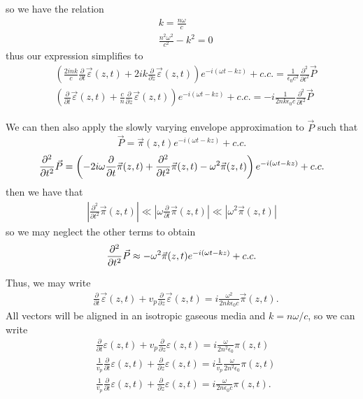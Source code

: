 \documentclass[aps,pra,showpacs,amsmath,amssymb,nofootinbib,longbibliography,superscriptaddress
]{revtex4-1}
\theoremstyle{definition}
\theoremstyle{remark}
\newcommand{\0}{\hat{0}}
\begin{document}
so we have the relation
\begin{align}
    &k = \frac{n \omega}{c}\\
    &\frac{n^2 \omega^2}{c^2} - k^2 = 0
\end{align}
thus our expression simplifies to
\begin{align}
    &\left(\frac{2 i n k}{c} \frac{\partial}{\partial t} \vec{\varepsilon}(z, t) + 2 i k \frac{\partial}{\partial z} \vec{\varepsilon}(z, t) \right)e^{-i (\omega t - kz)} + c.c. = \frac{1}{\epsilon_0 c^2} \frac{\partial^2}{\partial t^2} \vec{P} \nonumber\\
    &\left(\frac{\partial}{\partial t} \vec{\varepsilon}(z, t) + \frac{c}{n} \frac{\partial}{\partial z} \vec{\varepsilon}(z, t) \right)e^{-i (\omega t - kz)} + c.c. = -i\frac{1}{2nk \epsilon_0 c} \frac{\partial^2}{\partial t^2} \vec{P}  \nonumber
\end{align}

We can then also apply the slowly varying envelope approximation to $\vec{P}$ such that 
\begin{equation}
\vec{P} = \vec{\pi}(z, t) e^{-i (\omega t - kz)} + c.c.
\end{equation}
\begin{equation}
   \frac{\partial^2}{\partial t^2} \vec{P} = \left(-2 i \omega \frac{\partial}{\partial t} \vec{\pi}(z, t) + \frac{\partial^2}{\partial t^2}\vec{\pi}(z, t) - \omega^2 \vec{\pi}(z, t)\right) e^{-i (\omega t - kz)} + c.c.\\
\end{equation}
then we have that
\begin{align}
    \left| \frac{\partial^2}{\partial t^2}\vec{\pi}(z, t) \right| \ll \left| \omega \frac{\partial}{\partial t} \vec{\pi}(z, t) \right| \ll \left| \omega^2 \vec{\pi}(z, t) \right|
\end{align}
so we may neglect the other terms to obtain
\begin{equation}
   \frac{\partial^2}{\partial t^2} \vec{P} \approx - \omega^2 \vec{\pi}(z, t) e^{-i (\omega t - kz)} + c.c.\\
\end{equation}

Thus, we may write
\begin{align}
    &\frac{\partial}{\partial t} \vec{\varepsilon}(z, t) + v_p \frac{\partial}{\partial z} \vec{\varepsilon}(z, t) = i\frac{ \omega^2}{2nk \epsilon_0 c}  \vec{\pi}(z, t). \nonumber
\end{align}
All vectors will be aligned in an isotropic gaseous media and $k = n \omega / c$, so we can write
\begin{align}
    &\frac{\partial}{\partial t} \varepsilon(z, t) + v_p \frac{\partial}{\partial z} \varepsilon(z, t) = i\frac{ \omega}{2n^2 \epsilon_0} \pi(z, t) \nonumber \\
    &\frac{1}{v_p} \frac{\partial}{\partial t} \varepsilon(z, t) + \frac{\partial}{\partial z} \varepsilon(z, t) = i \frac{1}{v_p} \frac{ \omega}{2n^2 \epsilon_0} \pi(z, t) \nonumber \\
    &\frac{1}{v_p} \frac{\partial}{\partial t} \varepsilon(z, t) + \frac{\partial}{\partial z} \varepsilon(z, t) = i \frac{ \omega}{2n \epsilon_0 c} \pi(z, t).
\end{align}
\end{document}

